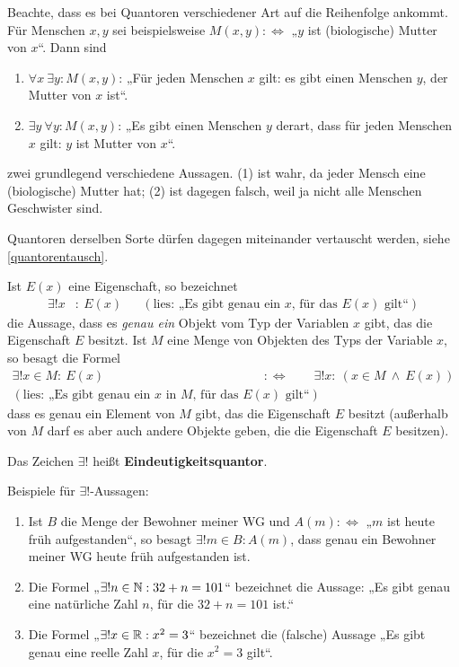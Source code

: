 
\begin{bem} \label{quantorreihenfolge}
    Beachte, dass es bei Quantoren verschiedener Art auf die Reihenfolge ankommt. Für Menschen $x,y$ sei beispielsweise $M(x,y):\Leftrightarrow$ „$y$ ist (biologische) Mutter von $x$“. Dann sind
    \begin{enumerate}[(1)]
        \item $\forall x\ \exists y: M(x,y)$: „Für jeden Menschen $x$ gilt: es gibt einen Menschen $y$, der Mutter von $x$ ist“.
        \item $\exists y\ \forall y: M(x,y)$: „Es gibt einen Menschen $y$ derart, dass für jeden Menschen $x$ gilt: $y$ ist Mutter von $x$“.
    \end{enumerate}
    zwei grundlegend verschiedene Aussagen. (1) ist wahr, da jeder Mensch eine (biologische) Mutter hat; (2) ist dagegen falsch, weil ja nicht alle Menschen Geschwister sind.
    
    Quantoren derselben Sorte dürfen dagegen miteinander vertauscht werden, siehe \cref{quantorentausch}.
\end{bem}


\begin{de} \label{def:eindquant}
    Ist $E(x)$ eine Eigenschaft, so bezeichnet
    \begin{align*}
        \exists ! x& :\ E(x) && (\text{lies: „Es gibt genau ein $x$, für das $E(x)$ gilt“})
    \end{align*}
    die Aussage, dass es \emph{genau ein} Objekt vom Typ der Variablen $x$ gibt, das die Eigenschaft $E$ besitzt. Ist $M$ eine Menge von Objekten des Typs der Variable $x$, so besagt die Formel
    \begin{align*}
        \exists ! x\in M :\ E(x) \qquad &:\Leftrightarrow\qquad \exists ! x:\ (x\in M\ \land\ E(x)) \\
        (\text{lies: „Es gibt genau ein $x$ in $M$, für das $E(x)$ gilt“})
    \end{align*}
    dass es genau ein Element von $M$ gibt, das die Eigenschaft $E$ besitzt (außerhalb von $M$ darf es aber auch andere Objekte geben, die die Eigenschaft $E$ besitzen).
    
    Das Zeichen $\exists !$ heißt \textbf{Eindeutigkeitsquantor}.
\end{de}


\begin{bsp}
    Beispiele für $\exists !$-Aussagen:
    \begin{enumerate}
        \item Ist $B$ die Menge der Bewohner meiner WG und $A(m):\Leftrightarrow$ „$m$ ist heute früh aufgestanden“, so besagt $\exists ! m\in B: A(m)$, dass genau ein Bewohner meiner WG heute früh aufgestanden ist.
        \item Die Formel „$\exists ! n\in \mathbb N : 32+n = 101$“ bezeichnet die Aussage: „Es gibt genau eine natürliche Zahl $n$, für die $32+n=101$ ist.“
        \item Die Formel „$\exists ! x\in \mathbb R: x^2=3$“ bezeichnet die (falsche) Aussage „Es gibt genau eine reelle Zahl $x$, für die $x^2=3$ gilt“.
    \end{enumerate}
\end{bsp}


